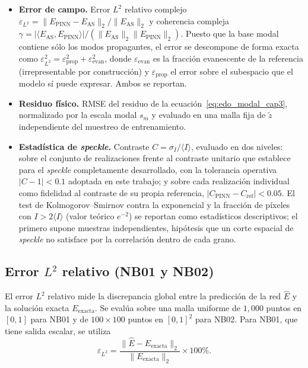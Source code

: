 \begin{itemize}
    \item \textbf{Error de campo.} Error $L^2$ relativo complejo
    $\varepsilon_{L^2}=\lVert E_\text{PINN}-E_\text{AS}\rVert_2/\lVert E_\text{AS}\rVert_2$
    y coherencia compleja
    $\gamma=|\langle E_\text{AS},E_\text{PINN}\rangle|/(\lVert E_\text{AS}\rVert_2\lVert E_\text{PINN}\rVert_2)$.
    Puesto que la base modal contiene sólo los modos propagantes, el error se
    descompone de forma exacta como
    $\varepsilon_{L^2}^2=\varepsilon_\text{prop}^2+\varepsilon_\text{evan}^2$,
    donde $\varepsilon_\text{evan}$ es la fracción evanescente de la referencia
    (irrepresentable por construcción) y $\varepsilon_\text{prop}$ el error
    sobre el subespacio que el modelo sí puede expresar. Ambos se reportan.

    \item \textbf{Residuo físico.} RMSE del residuo de la
    ecuación~\eqref{eq:edo_modal_cap3}, normalizado por la escala modal $s_m$ y
    evaluado en una malla fija de $\tilde z$ independiente del muestreo de
    entrenamiento.

    \item \textbf{Estadística de \textit{speckle}.} Contraste
    $C=\sigma_I/\langle I\rangle$, evaluado en dos niveles: sobre el conjunto de
    realizaciones frente al contraste unitario que
    \textcite{goodman2007speckle} establece para el \textit{speckle}
    completamente desarrollado, con la tolerancia operativa $|C-1|<0.1$
    adoptada en este trabajo; y sobre cada realización individual como
    fidelidad al contraste de su propia referencia,
    $|C_\text{PINN}-C_\text{ref}|<0.05$. El test de Kolmogorov--Smirnov contra
    la exponencial y la fracción de píxeles con $I>2\langle I\rangle$ (valor
    teórico $e^{-2}$) se reportan como estadísticos descriptivos; el primero
    supone muestras independientes, hipótesis que un corte espacial de
    \textit{speckle} no satisface por la correlación dentro de cada grano.
\end{itemize}

\subsection{Error $L^2$ relativo (NB01 y NB02)}

El error $L^2$ relativo mide la discrepancia global entre la predicción de la
red $\hat{E}$ y la solución exacta $E_\text{exacta}$. Se evalúa sobre una malla
uniforme de $1{,}000$ puntos en $[0,1]$ para NB01 y de $100 \times 100$ puntos
en $[0,1]^2$ para NB02. Para NB01, que tiene salida escalar, se utiliza
%
\begin{equation}
    \varepsilon_{L^2} = \frac{\|\hat{E} - E_\text{exacta}\|_2}
    {\|E_\text{exacta}\|_2} \times 100\%.
    \label{eq:l2}
\end{equation}

